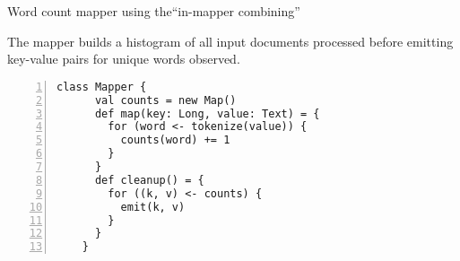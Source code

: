 \documentclass[11pt]{article}
\begin{document}
\begin{algorithm}[t]
    \caption{Word count mapper using the``in-mapper combining''}
    \label{algorithm:chapter3:word-count:outer-hash}
    The mapper builds a histogram of all input documents processed before
    emitting key-value pairs for unique words observed.
    \begin{small}
    \begin{Verbatim}[numbers=left, xleftmargin=7.5mm]
    class Mapper {
      val counts = new Map()
      def map(key: Long, value: Text) = {
        for (word <- tokenize(value)) {
          counts(word) += 1
        }
      }
      def cleanup() = {
        for ((k, v) <- counts) {
          emit(k, v)
        }
      }
    }
    \end{Verbatim}
    \end{small}
    \end{algorithm}
\end{document}
